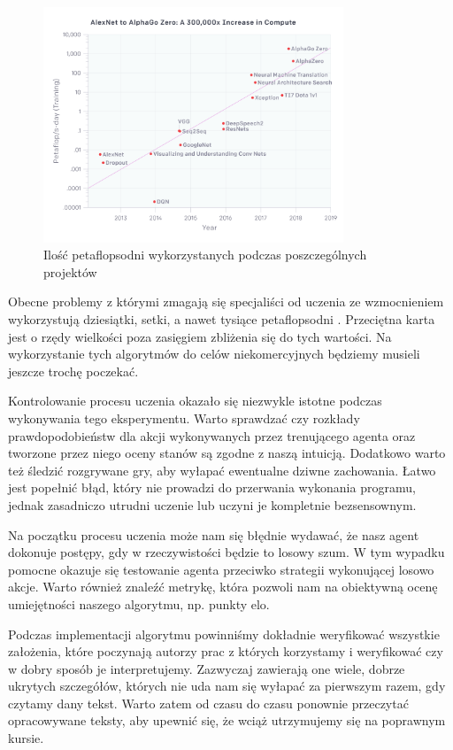 \documentclass[licencjacka]{pracamgr}
\begin{document}
\begin{figure}[ht]
  \centering
  \includegraphics[width=0.8\textwidth]{compute}
  \caption{Ilość petaflopsodni wykorzystanych podczas poszczególnych projektów \cite{dqn, resnet, dota2, nmt, alphago2016, alphagozero}}
\end{figure}

Obecne problemy z którymi zmagają się specjaliści od uczenia ze wzmocnieniem wykorzystują dziesiątki, setki, a nawet tysiące petaflopsodni \cite{openai-compute}. Przeciętna karta jest o rzędy wielkości poza zasięgiem zbliżenia się do tych wartości. Na wykorzystanie tych algorytmów do celów niekomercyjnych będziemy musieli jeszcze trochę poczekać.

Kontrolowanie procesu uczenia okazało się niezwykle istotne podczas wykonywania tego eksperymentu. Warto sprawdzać czy rozkłady prawdopodobieństw dla akcji wykonywanych przez trenującego agenta oraz tworzone przez niego oceny stanów są zgodne z naszą intuicją. Dodatkowo warto też śledzić rozgrywane gry, aby wyłapać ewentualne dziwne zachowania. Łatwo jest popełnić błąd, który nie prowadzi do przerwania wykonania programu, jednak zasadniczo utrudni uczenie lub uczyni je kompletnie bezsensownym.

Na początku procesu uczenia może nam się błędnie wydawać, że nasz agent dokonuje postępy, gdy w rzeczywistości będzie to losowy szum. W tym wypadku pomocne okazuje się testowanie agenta przeciwko strategii wykonującej losowo akcje. Warto również znaleźć metrykę, która pozwoli nam na obiektywną ocenę umiejętności naszego algorytmu, np. punkty elo.

Podczas implementacji algorytmu powinniśmy dokładnie weryfikować wszystkie założenia, które poczynają autorzy prac z których korzystamy i weryfikować czy w dobry sposób je interpretujemy. Zazwyczaj zawierają one wiele, dobrze ukrytych szczegółów, których nie uda nam się wyłapać za pierwszym razem, gdy czytamy dany tekst. Warto zatem od czasu do czasu ponownie przeczytać opracowywane teksty, aby upewnić się, że wciąż utrzymujemy się na poprawnym kursie.
\end{document}

